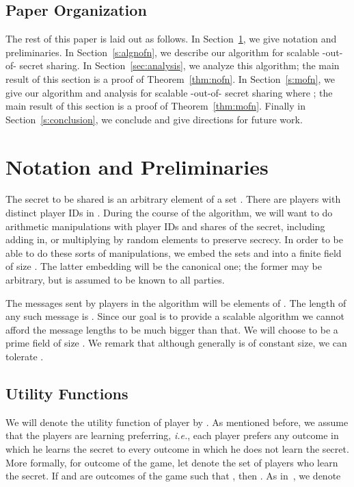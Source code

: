 \documentclass[12pt]{article}
\theoremstyle{definition}
\newcommand{\ie}{\emph{i.e.}}
\begin{document}
\subsection{Paper Organization}

The rest of this paper is laid out as follows.  In
Section~\ref{sec:prelim}, we give notation and preliminaries.  In
Section~\ref{s:algnofn}, we describe our algorithm for scalable
-out-of- secret sharing.  In Section~\ref{sec:analysis}, we
analyze this algorithm; the main result of this section is a proof of
Theorem~\ref{thm:nofn}.  In Section~\ref{s:mofn}, we give our
algorithm and analysis for scalable -out-of- secret sharing
where ; the main result of this section is a proof of 
Theorem~\ref{thm:mofn}.  Finally in Section~\ref{s:conclusion}, 
we conclude and give directions for future work.

\section{Notation and Preliminaries}\label{sec:prelim}

The secret to be shared is an arbitrary element of a set . 
There are  players with distinct player IDs in . 
During the course of the algorithm, we will want to do arithmetic 
manipulations with player IDs and shares of the secret, including adding 
in, or multiplying by random elements to preserve secrecy. In order to be 
able to do these sorts of manipulations, we embed the sets  
and  into a finite field  of size .
The latter embedding will be the canonical one; the former may be arbitrary, 
but is assumed to be known to all parties.

The messages sent by players in the algorithm will be elements of . 
The length of any such message is . Since our 
goal is to provide a scalable algorithm we cannot afford the message 
lengths to be much bigger than that. We will choose  to be a prime field
of size . We remark that although generally 
 is of constant size, we can tolerate .


\subsection{Utility Functions}
We will denote the utility function of player  by . As mentioned 
before, we assume that the players are learning preferring, \ie, each player 
prefers any outcome in which he learns the secret to every outcome in 
which he does not learn the secret. More formally, for outcome  
of the game, let  denote the set of players who learn the 
secret. If  and  are outcomes of the game such 
that , then 
. 
As in~\cite{kol2008games}, we denote
\end{document}
